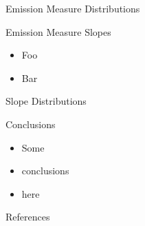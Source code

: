\documentclass[final]{beamer}
\begin{document}
\begin{frame}
\begin{columns}[T]
\begin{column}{0.49\linewidth}
\begin{block}{Emission Measure Distributions}
      \vspace{-2ex}
    \end{block}
    \begin{block}{Emission Measure Slopes}
      \vspace{-1ex}
      \begin{itemize}
      \item Foo
      \item Bar
      \end{itemize}
      \vspace{-1ex}
    \end{block}
    \begin{block}{Slope Distributions}
    \end{block}
    \begin{block}{Conclusions}
      \vspace{-1ex}
      \begin{itemize}
      \item Some
      \item conclusions
      \item here
      \end{itemize}
      \vspace{-1ex}
    \end{block}
    \begin{block}{References}
      \scriptsize
      \vspace{-2ex}
      \begin{multicols}{2}
        
        
      \end{multicols}
    \end{block}
  \end{column}
  \end{columns}
\end{frame}
\end{document}
